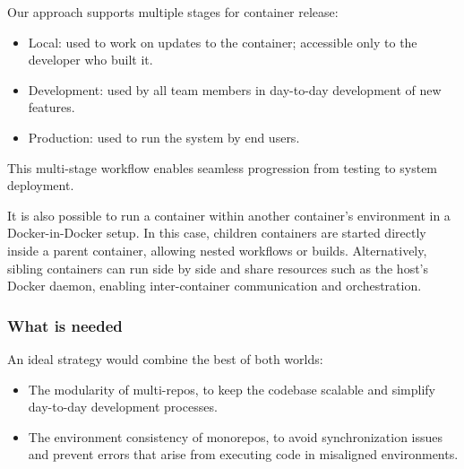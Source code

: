 \documentclass{article}
\begin{document}
Our approach supports multiple stages for container release:

\begin{itemize}

  \item Local: used to work on updates to the container; accessible only to the developer
    who built it.

  \item Development: used by all team members in day-to-day development of new
    features.

  \item Production: used to run the system by end users.
\end{itemize}

This multi-stage workflow enables seamless progression from testing to system
deployment.

It is also possible to run a container within another container's environment in
a Docker-in-Docker setup. In this case, children containers are started directly
inside a parent container, allowing nested workflows or builds. Alternatively, sibling
containers can run side by side and share resources such as the host's Docker daemon,
enabling inter-container communication and orchestration.

%


\subsubsection{What is needed}

An ideal strategy would combine the best of both worlds:

\begin{itemize}

  \item The modularity of multi-repos, to keep the codebase scalable and
    simplify day-to-day development processes.

  \item The environment consistency of monorepos, to avoid synchronization
    issues and prevent errors that arise from executing code in misaligned
    environments.
\end{itemize}
\end{document}
